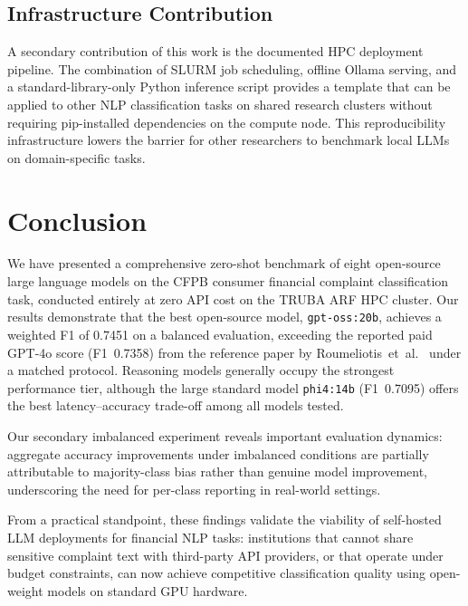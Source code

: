 \documentclass[journal]{IEEEtran}
\begin{document}
\subsection{Infrastructure Contribution}

A secondary contribution of this work is the documented HPC
deployment pipeline. The combination of SLURM job scheduling,
offline Ollama serving, and a standard-library-only Python inference
script provides a template that can be applied to other NLP
classification tasks on shared research clusters without requiring
pip-installed dependencies on the compute node. This reproducibility
infrastructure lowers the barrier for other researchers to benchmark
local LLMs on domain-specific tasks.

\section{Conclusion}
\label{sec:conclusion}

We have presented a comprehensive zero-shot benchmark of eight
open-source large language models on the CFPB consumer financial
complaint classification task, conducted entirely at zero API cost
on the TRUBA ARF HPC cluster. Our results demonstrate that the
best open-source model, \texttt{gpt-oss:20b}, achieves a weighted
F1 of 0.7451 on a balanced evaluation, exceeding the reported paid
GPT-4o score (F1~0.7358) from the reference paper by
Roumeliotis~et~al.\ \cite{roumeliotis2025think} under a matched
protocol. Reasoning models generally occupy the strongest performance
tier, although the large standard model \texttt{phi4:14b} (F1~0.7095)
offers the best latency–accuracy trade-off among all models tested.

Our secondary imbalanced experiment reveals important evaluation
dynamics: aggregate accuracy improvements under imbalanced
conditions are partially attributable to majority-class bias
rather than genuine model improvement, underscoring the need for
per-class reporting in real-world settings.

From a practical standpoint, these findings validate the viability
of self-hosted LLM deployments for financial NLP tasks: institutions
that cannot share sensitive complaint text with third-party API
providers, or that operate under budget constraints, can now achieve
competitive classification quality using open-weight models on
standard GPU hardware.
\end{document}

